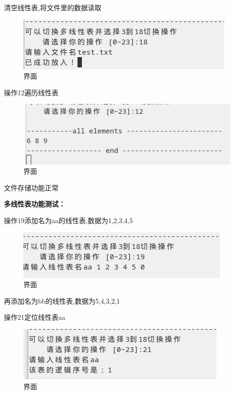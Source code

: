 \documentclass[supercite]{Experimental_Report}
\theoremstyle{definition}
\begin{document}
清空线性表,将文件里的数据读取

\begin{figure}[!htb]
	\begin{center}
		\includegraphics[scale=0.60]{images/1-31.png}
		\caption{界面}
		\label{fig1-31}
		\end{center}
\end{figure}

操作12遍历线性表

\begin{figure}[!htb]
	\begin{center}
		\includegraphics[scale=0.60]{images/1-32.png}
		\caption{界面}
		\label{fig1-32}
		\end{center}
\end{figure}

文件存储功能正常

\textbf{多线性表功能测试：}

操作19添加名为aa的线性表,数据为1,2,3,4,5

\begin{figure}[!htb]
	\begin{center}
		\includegraphics[scale=0.60]{images/1-33.png}
		\caption{界面}
		\label{fig1-33}
		\end{center}
\end{figure}

再添加名为bb的线性表,数据为5,4,3,2,1

操作21定位线性表aa

\begin{figure}[!htb]
	\begin{center}
		\includegraphics[scale=0.60]{images/1-34.png}
		\caption{界面}
		\label{fig1-34}
		\end{center}
\end{figure}
\end{document}
